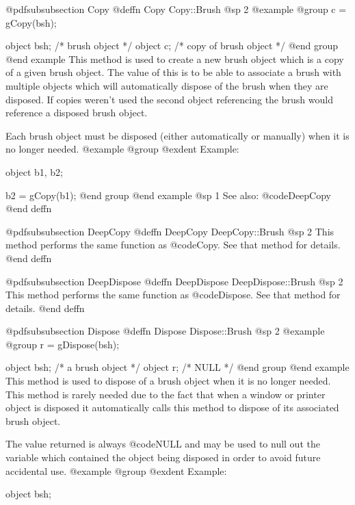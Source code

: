 @pdfsubsubsection {Copy}
@deffn {Copy} Copy::Brush
@sp 2
@example
@group
c = gCopy(bsh);

object  bsh;    /*  brush object          */
object  c;      /*  copy of brush object  */
@end group
@end example
This method is used to create a new brush object which is a copy of a
given brush object.  The value of this is to be able to associate a
brush with multiple objects which will automatically dispose of the
brush when they are disposed.  If copies weren't used the second object
referencing the brush would reference a disposed brush object.

Each brush object must be disposed (either automatically or manually)
when it is no longer needed.
@example
@group
@exdent Example:

object  b1, b2;

b2 = gCopy(b1);
@end group
@end example
@sp 1
See also:  @code{DeepCopy}
@end deffn









@pdfsubsubsection {DeepCopy}
@deffn {DeepCopy} DeepCopy::Brush
@sp 2
This method performs the same function as @code{Copy}.  See that
method for details.
@end deffn





@pdfsubsubsection {DeepDispose}
@deffn {DeepDispose} DeepDispose::Brush
@sp 2
This method performs the same function as @code{Dispose}.  See that
method for details.
@end deffn







@pdfsubsubsection {Dispose}
@deffn {Dispose} Dispose::Brush
@sp 2
@example
@group
r = gDispose(bsh);

object  bsh;   /*  a brush object  */
object  r;     /*  NULL            */
@end group
@end example
This method is used to dispose of a brush object when it is no longer
needed.  This method is rarely needed due to the fact that when a window
or printer object is disposed it automatically calls this method to
dispose of its associated brush object.

The value returned is always @code{NULL} and may be used to null out
the variable which contained the object being disposed in order to
avoid future accidental use.
@example
@group
@exdent Example:

object  bsh;

